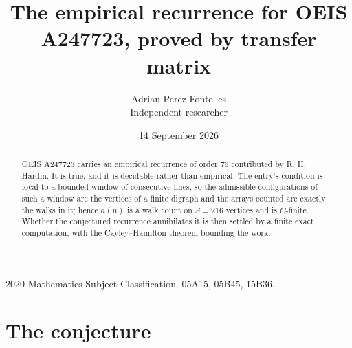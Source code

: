 \documentclass[11pt,a4paper]{article}
\title{The empirical recurrence for OEIS A247723, proved by transfer matrix}
\author{Adrian Perez Fontelles\\ \small Independent researcher}
\date{14 September 2026}
\theoremstyle{plain}
\theoremstyle{definition}
\begin{document}
\maketitle

\begin{abstract}
OEIS A247723 carries an empirical recurrence of order $76$ contributed by R. H. Hardin. It is
true, and it is decidable rather than empirical. The entry's condition is local to a bounded window of consecutive lines, so
the admissible configurations of such a window are the vertices of a finite digraph and the
arrays counted are exactly the walks in it; hence $a(n)$ is a walk count on $S=216$ vertices
and is $C$-finite. Whether the conjectured recurrence annihilates it is then settled by a
finite exact computation, with the Cayley--Hamilton theorem bounding the work.
\end{abstract}

\noindent\small 2020 Mathematics Subject Classification. 05A15, 05B45, 15B36.\normalsize

\section{The conjecture}
\end{document}
